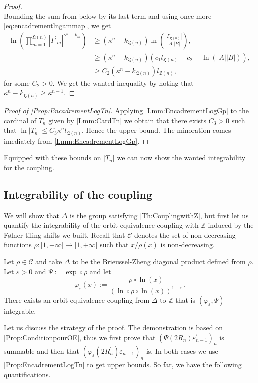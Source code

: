\documentclass[english, 11pt, a4paper]{article}
\theoremstyle{definition}
\numberwithin{equation}{section}
\newcommand{\bZ}{\mathbb{Z}}
\newcommand{\calC}{\mathcal{C}}
\newcommand{\BZ}{\Delta}
\newcommand{\RZ}{R^\prime}
\newcommand{\epsZ}{\varepsilon^\prime}
\newcommand{\Landing}{\mathfrak{L}}
\newcommand{\CTn}{C_{3}}
\begin{document}
\begin{proof}
\begin{equation*}
  \end{equation*}
  Bounding the sum from below by its last term and using once more
  \cref{eq:encadrementlngammap}, we get  
  \begin{align*}
    \ln \left(
    \prod^{\Landing(n)}_{m=1} {\left\vert {\Gamma^\prime}_m \right\vert}^{\kappa^n-k_m} \right)
    &\geq (\kappa^n-k_{\Landing(n)})\ln \left( \frac{|\Gamma_{\Landing(n)} |}{|A||B|} \right) ,\\
    &\geq (\kappa^n-k_{\Landing(n)})\left( c_1l_{\Landing(n)}-c_2 -\ln \left( |A||B| \right) \right),\\
    &\geq C_2(\kappa^n - k_{\Landing(n)})l_{\Landing(n)},
  \end{align*}
  for some $C_2>0$. We get the wanted inequality by noting that
  $\kappa^n - k_{\Landing(n)}\geq \kappa^{n-1}$.
\end{proof}
\begin{proof}[Proof of \cref{Prop:EncadrementLogTn}]
  Applying \cref{Lmm:EncadrementLogGp} to the cardinal of $T_n$ given by
  \cref{Lmm:CardTn} we obtain that there exists $\CTn>0$ such that $\ln|T_n|
  \leq \CTn  \kappa^n l_{\Landing(n)}$. Hence the upper bound.   
  The minoration comes imediately from \cref{Lmm:EncadrementLogGp}.
\end{proof}

Equipped with these bounds on $|T_n|$ we can now show the wanted integrability
for the coupling.

\subsection{Integrability of the coupling}
We will show that $\BZ$ is the group satisfying \cref{Th:CouplingwithZ}, but
first let us quantify the integrability of the orbit equivalence coupling with
$\bZ$ induced by the Følner tiling shifts we built.
Recall that $\calC$ denotes the set of non-decreasing functions $\rho\colon
[1,+\infty[ \rightarrow [1,+\infty[$ such that $x/\rho(x)$ is non-decreasing. 
\newpage

\begin{Th}\label{Th:OEZBZ}
  Let $\rho \in \calC$ and take $\BZ$ to be the Brieussel-Zheng diagonal
  product defined from $\rho$.
  Let $\varepsilon >0$ and $\Psi := \exp \circ \rho$ and let
  \begin{equation*}
    \varphi_{\varepsilon}(x):=\frac{\rho\circ \ln(x)}%
    {\left( \ln\circ \rho\circ \ln (x) \right)^{1+\varepsilon}}. 
  \end{equation*}
  There exists an orbit equivalence coupling from $\BZ$ to $\bZ$ that is
  $(\varphi_{\varepsilon},\Psi)$-integrable.
\end{Th}
Let us discuss the strategy of the proof. The demonstration is based on
\cref{Prop:ConditionpourOE}, thus we first prove that
$(\Psi(2R_n)\epsZ_{n-1})_n$ is summable and then that
$(\varphi_{\varepsilon}(2\RZ_n)\varepsilon_{n-1})_n$ 
is. In both cases we use \cref{Prop:EncadrementLogTn} to get upper bounds.
So far, we have the following quantifications.
\end{document}
